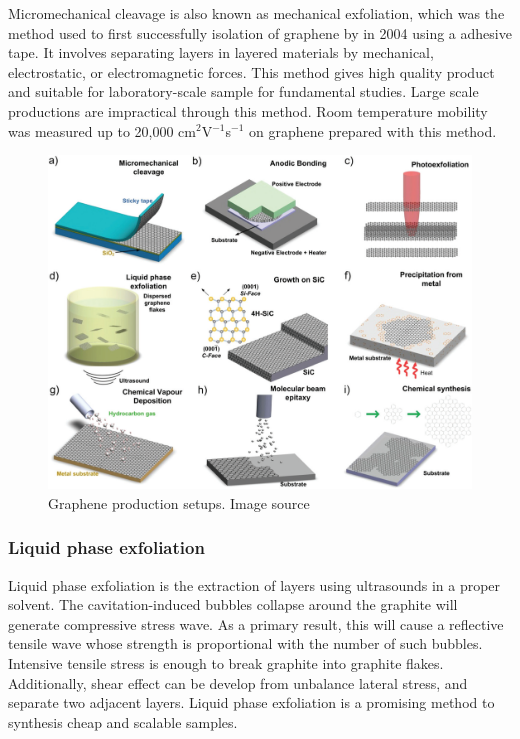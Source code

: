 Micromechanical cleavage is also known as mechanical exfoliation, which was the method used to first successfully isolation of graphene by \citet{Novoselov26072005} in 2004 using a adhesive tape. It involves separating layers in layered materials by mechanical, electrostatic, or electromagnetic forces. This method gives high quality product and suitable for laboratory-scale sample for fundamental studies. Large scale productions are impractical through this method.  Room temperature mobility was measured up to 20,000 cm$^2$V$^{-1}$s$^{-1}$\cite{Ni2010} on graphene prepared with this method.

\begin{figure}[htbp!] 
\centering  
\includegraphics[width=\textwidth]{synthesis.png}
\caption{Graphene production setups. Image source \cite{Ferrari2015}}  
\label{fig:syn}
\end{figure} 

\subsubsection{Liquid phase exfoliation}

Liquid phase exfoliation is the extraction of layers using ultrasounds in a proper solvent. The cavitation-induced bubbles collapse around the graphite will generate compressive stress wave. As a primary result, this will cause a reflective tensile wave whose strength is proportional with the number of such bubbles. Intensive tensile stress is enough to break graphite into graphite flakes. Additionally, shear effect can be develop from unbalance lateral stress, and separate two adjacent layers. Liquid phase exfoliation is a promising method to synthesis cheap and scalable samples. 

